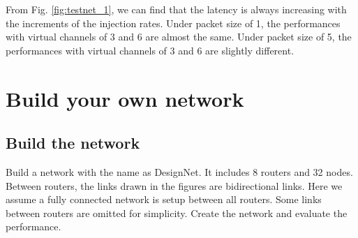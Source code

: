 From Fig. \ref{fig:testnet_1}, we can find that the latency is always increasing with the increments of the injection rates. Under packet size of 1, the performances with virtual channels of 3 and 6 are almost the same. Under packet size of 5, the performances with virtual channels of 3 and 6 are slightly different.


\section{Build your own network}

\subsection{Build the network}
Build a network with the name as DesignNet. It includes 8 routers and 32 nodes. Between routers, the links drawn in the figures are bidirectional links. Here we assume a fully connected network is setup between all routers. Some links between routers are omitted for simplicity. Create the network and evaluate the performance.

